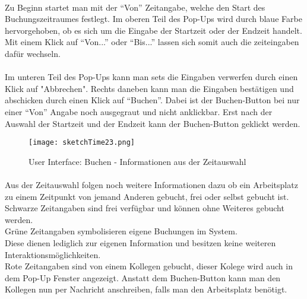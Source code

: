 \paragraph{} Zu Beginn startet man mit der "`Von"' Zeitangabe, welche den Start des Buchungszeitraumes festlegt. 
Im oberen Teil des Pop-Ups wird durch blaue Farbe hervorgehoben, ob es sich um die Eingabe der Startzeit oder der Endzeit handelt.
Mit einem Klick auf "`Von..."' oder "`Bis..."' lassen sich somit auch die zeiteingaben dafür wechseln. 

\paragraph{}Im unteren Teil des Pop-Ups kann man sets die Eingaben verwerfen durch einen Klick auf "Abbrechen".
Rechts daneben kann man die Eingaben bestätigen und abschicken durch einen Klick auf "`Buchen"'.
Dabei ist der Buchen-Button bei nur einer "`Von"' Angabe noch ausgegraut und nicht anklickbar.
Erst nach der Auswahl der Startzeit und der Endzeit kann der Buchen-Button geklickt werden.

\begin{figure}[!h]
  \centering
  \texttt{[image: sketchTime23.png]}
  \caption{User Interface: Buchen - Informationen aus der Zeitauswahl}
  \label{fig:sketch_time_23}
\end{figure}

\paragraph{}Aus der Zeitauswahl folgen noch weitere Informationen dazu ob ein Arbeitsplatz zu einem Zeitpunkt von jemand Anderen gebucht, frei oder selbst gebucht ist. \\
Schwarze Zeitangaben sind frei verfügbar und können ohne Weiteres gebucht werden. \\
Grüne Zeitangaben symbolisieren eigene Buchungen im System. \\
Diese dienen lediglich zur eigenen Information und besitzen keine weiteren Interaktionsmöglichkeiten.\\
Rote Zeitangaben sind von einem Kollegen gebucht, dieser Kolege wird auch in dem Pop-Up Fenster angezeigt.
Anstatt dem Buchen-Button kann man den Kollegen nun per Nachricht anschreiben, falls man den Arbeitsplatz benötigt. 
